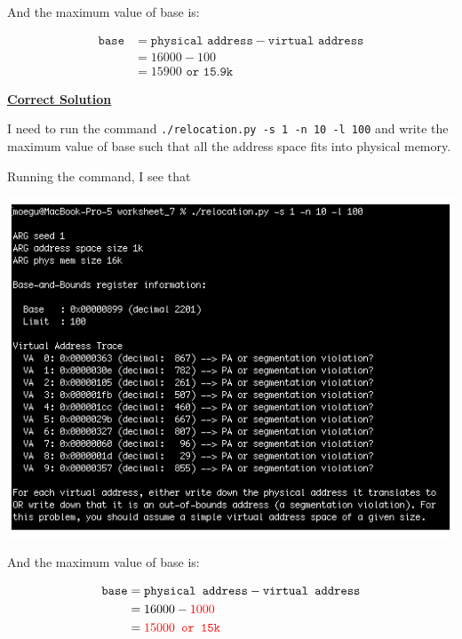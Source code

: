 \documentclass[12pt]{article}
\begin{document}
\begin{enumerate}[1.]
    \bigskip

    And the maximum value of base is:

    \begin{align}
        \texttt{base} &= \texttt{physical address} - \texttt{virtual address}\\
        &= 16000 - 100\\
        &= 15900 \texttt{ or 15.9k}
    \end{align}

    \bigskip

    \begin{mdframed}
    \underline{\textbf{Correct Solution}}

    \bigskip

    I need to run the command \texttt{./relocation.py -s 1 -n 10 -l 100} and write
    the maximum value of base such that all the address space fits into physical memory.

    \bigskip

    Running the command, I see that

    \begin{center}
    \includegraphics[width=0.8\linewidth]{images/worksheet_7_solution_5.png}
    \end{center}

    \bigskip

    And the maximum value of base is:

    \begin{align}
        \texttt{base} &= \texttt{physical address} - \texttt{virtual address}\\
        &= 16000 - \color{red}1000\color{black}\\
        &= \color{red}15000 \texttt{ or 15k}\color{black}
    \end{align}


\end{mdframed}
\end{enumerate}
\end{document}
